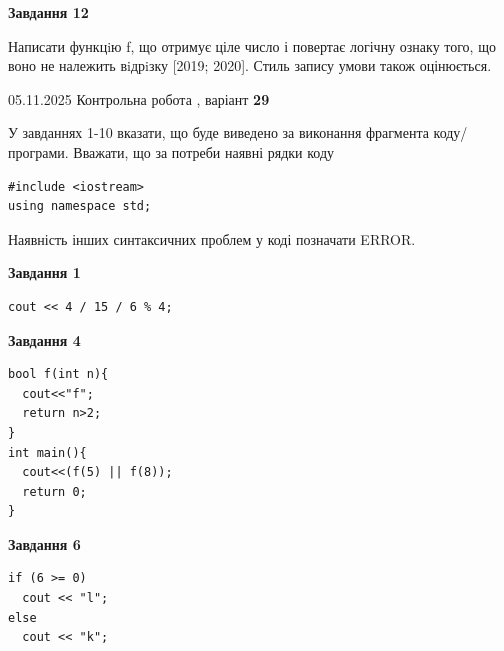 \documentclass[12pt, ukrainian]{article}
\begin{document}
{\begin {large}
\begin{minipage}[t]{11.0cm}
\begin{center}
\textbf{Завдання 12}
\end{center}

Написати функцiю f, що отримує ціле число і повертає логічну ознаку того, що воно не належить вiдрiзку [2019; 2020]. Стиль запису умови також оцінюється.\par

\end{minipage}

\end {large}}
\newpage

{\Large{05.11.2025 Контрольна робота , варіант  \No \textbf { 29 }\par}}
{
\begin {large}
У завданнях 1-10 вказати, що буде виведено за виконання фрагмента коду/про\-гра\-ми.
Вважати, що за потреби наявні рядки коду
\begin{verbatim}
#include <iostream>
using namespace std;
\end{verbatim}
Наявність інших синтаксичних проблем у коді позначати ERROR.

\begin{minipage}[t]{7.0cm}

\begin{center}
\textbf{Завдання 1}
\end{center}
\vspace{-8mm}

\begin{verbatim}
cout << 4 / 15 / 6 % 4;
\end{verbatim}



\begin{center}
\textbf{Завдання 4}
\end{center}
\vspace{-8mm}

\begin{verbatim}
bool f(int n){
  cout<<"f";
  return n>2;
}
int main(){
  cout<<(f(5) || f(8));
  return 0;
}
\end{verbatim}



\begin{center}
\textbf{Завдання 6}
\end{center}
\vspace{-8mm}

\begin{verbatim}
if (6 >= 0)
  cout << "l";
else
  cout << "k";
\end{verbatim}




\end{minipage}
\end{large}}
\end{document}
